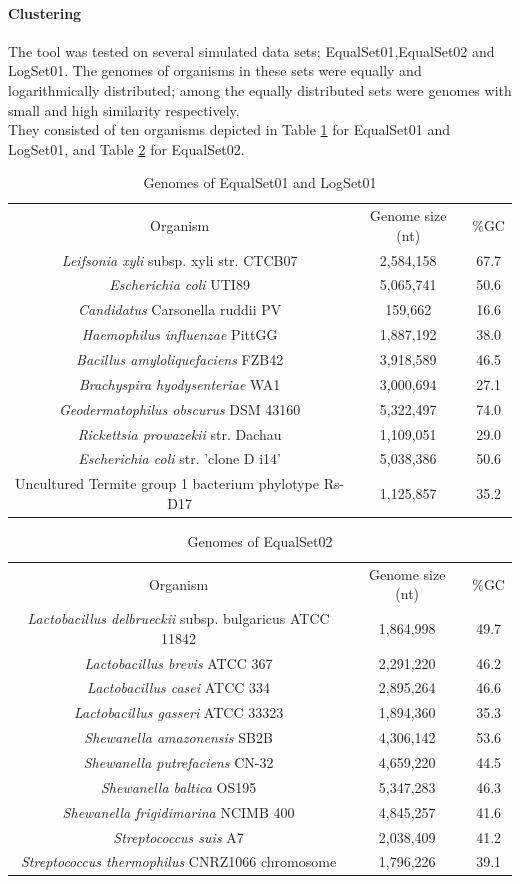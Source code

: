 \documentclass[twocolumn]{bmcart}%
\begin{document}
\paragraph*{Clustering}
The tool was tested on several simulated data sets; EqualSet01,EqualSet02 and LogSet01. The genomes of organisms in these sets were equally and logarithmically distributed; among the equally distributed sets were genomes with small and high similarity respectively. \\
They consisted of ten organisms depicted in Table \ref{tab:eqloggenes} for EqualSet01 and LogSet01, and Table \ref{tab:eqgenomes} for EqualSet02.
\begin{table}
	\centering
	\caption{Genomes of EqualSet01 and LogSet01 \cite{Laczny2014}}
	\begin{tabular}{ccc}
		Organism&Genome size (nt)&\%GC\\
		\textit{Leifsonia xyli} subsp.  xyli str.  CTCB07&2,584,158&67.7\\
		\textit{Escherichia coli} UTI89&5,065,741&50.6\\
		\textit{Candidatus}	Carsonella ruddii PV&159,662&16.6\\
		\textit{Haemophilus influenzae}	PittGG&1,887,192&38.0\\
		\textit{Bacillus amyloliquefaciens}	FZB42&3,918,589&46.5\\
		\textit{Brachyspira hyodysenteriae} WA1&3,000,694&27.1\\
		\textit{Geodermatophilus obscurus} DSM 43160&5,322,497&74.0\\
		\textit{Rickettsia prowazekii} str.  Dachau&1,109,051&29.0\\
		\textit{Escherichia coli} str.  ’clone D i14’&5,038,386&50.6\\
		Uncultured Termite group 1 bacterium phylotype Rs-D17&1,125,857&35.2	
	\end{tabular}
\label{tab:eqloggenes}
\end{table}
\begin{table}
	\centering
	\caption{Genomes of EqualSet02 \cite{Laczny2014}}
	\begin{tabular}{ccc}
		Organism&Genome size (nt)&\%GC\\
		\textit{Lactobacillus delbrueckii} subsp.  bulgaricus ATCC 11842&1,864,998&49.7\\
		\textit{Lactobacillus brevis} ATCC 367&2,291,220&46.2\\
		\textit{Lactobacillus casei} ATCC 334&2,895,264&46.6\\
		\textit{Lactobacillus gasseri}	ATCC 33323&1,894,360&35.3\\
		\textit{Shewanella amazonensis}	SB2B&4,306,142&53.6\\
		\textit{Shewanella putrefaciens} CN-32&4,659,220&44.5\\
		\textit{Shewanella baltica}	OS195&5,347,283&46.3\\
		\textit{Shewanella frigidimarina}	NCIMB 400&4,845,257&41.6\\
		\textit{Streptococcus suis}	A7&2,038,409&41.2\\
		\textit{Streptococcus thermophilus}	CNRZ1066 chromosome&1,796,226&39.1
	\end{tabular}
\label{tab:eqgenomes}
\end{table}%
\end{document}
